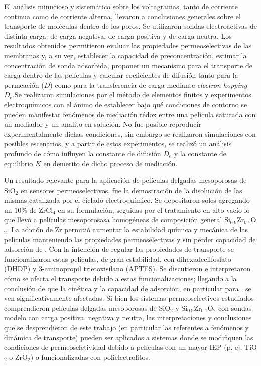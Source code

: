  El análisis minucioso y sistemático sobre los voltagramas, tanto de corriente continua como de corriente alterna, llevaron a conclusiones generales sobre el transporte de moléculas dentro de los poros. Se utilizaron sondas electroactivas de distinta carga: \ferroferri\space de carga negativa, \aminorutenio\space de carga positiva y \ferroceno\space de carga neutra. Los resultados obtenidos permitieron evaluar las propiedades permeoselectivas de las membranas y, a su vez, establecer la capacidad de preconcentración, estimar la concentración de sonda adsorbida, proponer un mecanismo para el transporte de carga dentro de las películas y calcular coeficientes de difusión tanto para la permeación ($D$) como para la transferencia de carga mediante \textit{electron hopping} $D_e$.Se realizaron simulaciones por el método de elementos finitos y experimentos electroquímicos con el ánimo de establecer bajo qué condiciones de contorno se pueden manifestar fenómenos de mediación rédox entre una película saturada con un mediador y un analito en solución. No fue posible reproducir experimentalmente dichas condiciones, sin embargo se realizaron simulaciones con posibles escenarios, y a partir de estos experimentos, se realizó un análisis profundo de cómo influyen la constante de difusión $D_e$ y la constante de equilibrio $K$ en demerito de dicho proceso de mediación. 

 Un resultado relevante para la aplicación de películas delgadas mesoporosas de SiO$_2$ en sensores permeoselectivos, fue la demostración de la disolución de las mismas  catalizada por el ciclado electroquímico. Se depositaron soles agregando un 10\% de  ZrCl$_4$ en su formulación, seguidas por el tratamiento en alto vacío lo que llevó a películas mesoporosasa homogéneas de composición general Si$_{0.9}$Zr$_{0.1}$O$_2$. La adición de Zr permitió aumentar la estabilidad química y mecánica de las películas manteniendo las propiedades permeoselectivas y sin perder capacidad de adsorción de \aminorutenio. Con la intención de regular las propiedades de transporte se funcionalizaron estas películas, de gran estabilidad, con dihexadecilfosfato (DHDP) y 3-aminopropil trietoxisilano (APTES). Se discutieron e interpretaron cómo se afecta el transporte debido a estas funcionalizaciones; llegando a la conclusión de que la cinética y la capacidad de adsorción, en particular para \ru, se ven significativamente afectadas. Si bien los sistemas permeoselectivos estudiados comprendieron películas delgadas mesoporosas de SiO$_2$ y Si$_{0.9}$Zr$_{0.1}$O$_2$ con sondas modelo con carga positiva, negativa y neutra, las interpretaciones y conclusiones que se desprendieron de este trabajo (en particular las referentes a  fenómenos y dinámica de transporte) pueden ser aplicados a sistemas donde se modifiquen las condiciones de permeoseletividad debido a películas con un mayor IEP (p. ej. TiO$_2$ o ZrO$_2$) o funcionalizadas con polielectrolitos. 
 
